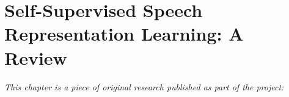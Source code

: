 
\chapter[self"=supervised speech representation learning: a review]{Self-Supervised Speech Representation Learning: A Review}
\label{app:paper-review}

\textit{This chapter is a piece of original research published as part of the project:} \newline
\begin{center}
    \begin{enumerate}[leftmargin=8mm,rightmargin=8mm,topsep=0mm,label={[\Alph*]}]
        \setcounter{enumi}{6}
        \item {} \co \parencite{mohamed_selfsupervised_2022}
        \end{enumerate}
\end{center}

